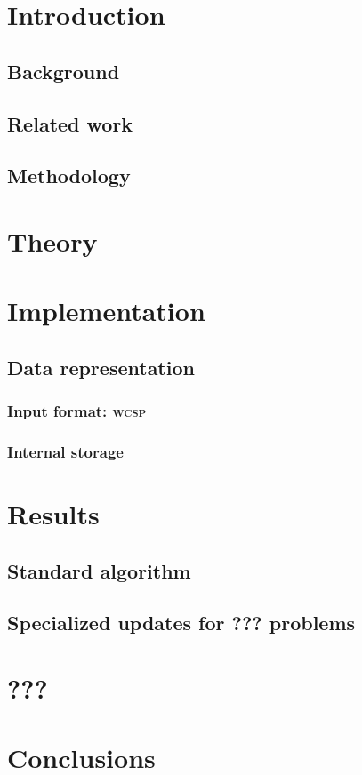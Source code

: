 \documentclass[paper=A4,DIV=calc]{scrbook}
\theoremstyle{plain}
\theoremstyle{definition}
\begin{document}
	\frontmatter
	\makefrontmatter

	\cleardoublepage
	\tableofcontents
	
	\mainmatter
	\chapter{Introduction}
	\section{Background}
	\section{Related work}
	\section{Methodology}

	\chapter{Theory}
	
	
	
	

	\chapter{Implementation}
	\section{Data representation}
	\subsection{Input format: \textsc{wcsp}}
	\subsection{Internal storage}

	\chapter{Results}
	\section{Standard algorithm}
	\section{Specialized updates for ??? problems}

	\chapter{???}

	\chapter{Conclusions}

	\nocite{*}
	\printglossary[type=\acronymtype,]
	\printbibliography[heading=bibintoc]
	\backmatter
\end{document}
